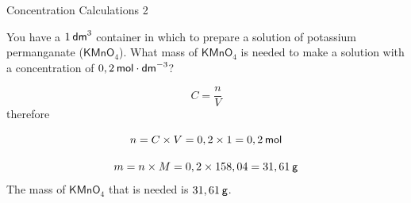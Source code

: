     \noindent
\par
\vspace{.5cm} 

      \begin{wex}{Concentration Calculations 2 }
{
You have a $1\phantom{\rule{2pt}{0ex}}{\mathsf{dm}}^{3}$ container in which to prepare a solution of potassium permanganate ($\mathsf{KMnO}{}_{4}$). What mass of $\mathsf{KMnO}{}_{4}$ is needed to make a solution with a concentration of $0,2\phantom{\rule{2pt}{0ex}}\mathsf{mol}\cdot \mathsf{dm}^{-3}$?\par 
      \vspace{5pt}}
{
      \label{m38712*id283297}\nopagebreak\noindent{}
        
    \begin{equation*}
    C=\frac{n}{V}
      \end{equation*}
      \label{m38712*id283318}therefore\par 
      \label{m38712*id283321}\nopagebreak\noindent{}
        
    \begin{equation*}
    n=C\ensuremath{\times}V=0,2\ensuremath{\times}1=0,2\phantom{\rule{2pt}{0ex}}\mathsf{mol}
      \end{equation*}
      \label{m38712*id283387}\nopagebreak\noindent{}
        
    \begin{equation*}
    m=n\ensuremath{\times}M=0,2\ensuremath{\times}158,04=31,61\phantom{\rule{2pt}{0ex}}\mathsf{g}
      \end{equation*}
      \label{m38712*id283435}The mass of $\mathsf{KMnO}{}_{4}$ that is needed is $31,61\phantom{\rule{2pt}{0ex}}\mathsf{g}$.
 \par 
}
    \end{wex}
    \noindent
\label{m38712*secfhsst!!!underscore!!!id1795}\vspace{.5cm} 

